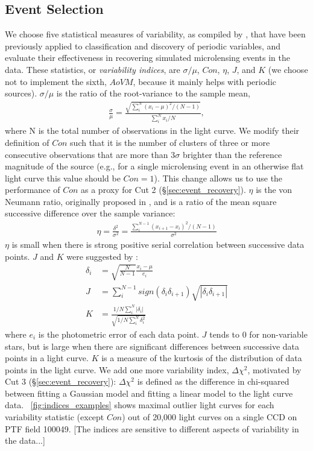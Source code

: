 \documentclass[12pt,preprint]{aastex}
\newcommand{\apwsim}{\raisebox{0.2ex}{\scriptsize$\sim$\normalsize}}
\begin{document}
\subsection{Event Selection} \label{sec:event_selection}
We choose five statistical measures of variability, as compiled by \cite{shin2009}, that have been previously applied to classification and discovery of periodic variables, and evaluate their effectiveness in recovering simulated microlensing events in the data. These statistics, or \emph{variability indices}, are $\sigma/\mu$, $Con$, $\eta$, $J$, and $K$ (we choose not to implement the sixth, $AoVM$, because it mainly helps with periodic sources). $\sigma/\mu$ is the ratio of the root-variance to the sample mean, 
\begin{align}
	\frac{\sigma}{\mu} = \frac{\sqrt{\sum^N_i (x_i - \mu)^2 / (N-1)}}{\sum^N_i x_i/N},
\end{align}
where N is the total number of observations in the light curve. We modify their definition of $Con$ such that it is the number of clusters of three or more consecutive observations that are more than $3\sigma$ brighter than the reference magnitude of the source (e.g., for a single microlensing event in an otherwise flat light curve this value should be $Con=1$). This change allows us to use the performance of $Con$ as a proxy for Cut 2 (\S\ref{sec:event_recovery}). $\eta$ is the von Neumann ratio, originally proposed in \cite{von_neumann1941}, and is a ratio of the mean square successive difference over the sample variance:
\begin{align}
	\eta = \frac{\delta^2}{\sigma^2} = \frac{\sum^{N-1}_i(x_{i+1} - x_i)^2/(N-1)}{\sigma^2}
\end{align}
$\eta$ is small when there is strong positive serial correlation between successive data points. $J$ and $K$ were suggested by \cite{stetson1996}:
\begin{align}
	\delta_i &= \sqrt{\frac{N}{N-1}}\frac{x_i-\mu}{e_i}\\
	J &= \sum^{N-1}_i sign(\delta_i \delta_{i+1})\sqrt{|\delta_i \delta_{i+1}|}\\
	K &= \frac{1/N\sum^N_i |\delta_i|}{\sqrt{1/N\sum^N_i\delta_i^2}}
\end{align}
where $e_i$ is the photometric error of each data point. $J$ tends to 0 for non-variable stars, but is large when there are significant differences between successive data points in a light curve. $K$ is a measure of the kurtosis of the distribution of data points in the light curve. We add one more variability index, $\Delta \chi^2$, motivated by Cut 3 (\S\ref{sec:event_recovery}): $\Delta \chi^2$ is defined as the difference in chi-squared between fitting a Gaussian model and fitting a linear model to the light curve data. \figurename~\ref{fig:indices_examples} shows maximal outlier light curves for each variability statistic (except $Con$) out of \apwsim 20,000 light curves on a single CCD on PTF field 100049. [The indices are sensitive to different aspects of variability in the data...]
\end{document}
